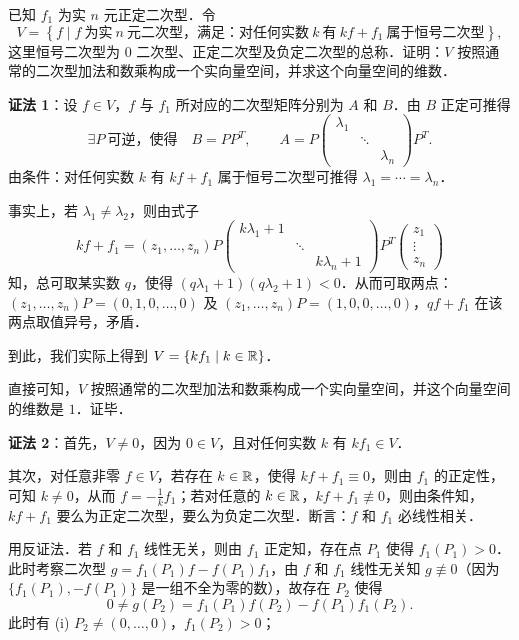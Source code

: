 已知 $f_1$ 为实 $n$ 元正定二次型．令
\[
  V=\left\{f\mid f\ \text{为实}\ n\ \text{元二次型，满足：对任何实数}\ k\ \text{有}\ kf+f_1\ \text{属于恒号二次型}\right\},
\]
这里恒号二次型为 $0$ 二次型、正定二次型及负定二次型的总称．证明：$V$ 按照通常的二次型加法和数乘构成一个实向量空间，并求这个向量空间的维数．

\begin{solution}
\textbf{证法 1}：设 $f\in V$，$f$ 与 $f_1$ 所对应的二次型矩阵分别为 $A$ 和 $B$．由 $B$ 正定可推得
\[
  \exists P\ \text{可逆，使得}\quad
  B=PP^{T},\qquad
  A=P\begin{pmatrix}
    \lambda_1 & & \\
     & \ddots & \\
     & & \lambda_n
  \end{pmatrix}P^{T}.
\]
由条件：对任何实数 $k$ 有 $kf+f_1$ 属于恒号二次型可推得 $\lambda_1=\cdots=\lambda_n$．

事实上，若 $\lambda_1\ne\lambda_2$，则由式子
\[
  kf+f_1=(z_1,\dots,z_n)P
  \begin{pmatrix}
    k\lambda_1+1 & & \\
     & \ddots & \\
     & & k\lambda_n+1
  \end{pmatrix}
  P^{T}\begin{pmatrix}z_1\\\vdots\\z_n\end{pmatrix}
\]
知，总可取某实数 $q$，使得 $(q\lambda_1+1)(q\lambda_2+1)<0$．从而可取两点：$(z_1,\dots,z_n)P=(0,1,0,\dots,0)$ 及 $(z_1,\dots,z_n)P=(1,0,0,\dots,0)$，$qf+f_1$ 在该两点取值异号，矛盾．

到此，我们实际上得到 $V=\{kf_1\mid k\in\mathbb{R}\}$．

直接可知，$V$ 按照通常的二次型加法和数乘构成一个实向量空间，并这个向量空间的维数是 $1$．证毕．

\textbf{证法 2}：首先，$V\ne0$，因为 $0\in V$，且对任何实数 $k$ 有 $kf_1\in V$．

其次，对任意非零 $f\in V$，若存在 $k\in\mathbb{R}$，使得 $kf+f_1\equiv0$，则由 $f_1$ 的正定性，可知 $k\ne0$，从而 $f=-\frac1k f_1$；若对任意的 $k\in\mathbb{R}$，$kf+f_1\not\equiv0$，则由条件知，$kf+f_1$ 要么为正定二次型，要么为负定二次型．断言：$f$ 和 $f_1$ 必线性相关．

用反证法．若 $f$ 和 $f_1$ 线性无关，则由 $f_1$ 正定知，存在点 $P_1$ 使得 $f_1(P_1)>0$．此时考察二次型 $g=f_1(P_1)f-f(P_1)f_1$，由 $f$ 和 $f_1$ 线性无关知 $g\not\equiv0$（因为 $\{f_1(P_1),-f(P_1)\}$ 是一组不全为零的数），故存在 $P_2$ 使得
\begin{equation}
  0\ne g(P_2)=f_1(P_1)f(P_2)-f(P_1)f_1(P_2).\tag{$*$}
\end{equation}
此时有
(i) $P_2\ne(0,\dots,0)$，$f_1(P_2)>0$；


\end{solution}
